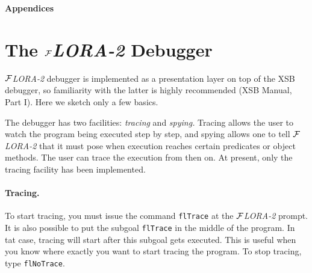 \documentclass[11pt]{article}
\newcommand{\FLORA}{{\mbox{${\cal F}${\small\it LORA}\rm\emph{-2}}}\xspace}
\begin{document}
\appendix

\newpage

\noindent
{\LARGE\bf Appendices}


\section{The \FLORA Debugger}


\FLORA debugger is implemented as a presentation layer on top of the XSB
debugger, so familiarity with the latter is highly recommended (XSB Manual,
Part I). Here we sketch only a few basics.

The debugger has two facilities: \emph{tracing} and \emph{spying.} Tracing
allows the user to watch the program being executed step by step, and
spying allows one to tell \FLORA that it must pose when execution reaches
certain predicates or object methods. The user can trace the execution from
then on. At present, only the tracing facility has been implemented.

\paragraph{Tracing.}
To start tracing, you must issue the command {\tt flTrace} at the
\FLORA prompt. It is also possible to put the subgoal {\tt flTrace} in
the middle of the program. In tat case, tracing will start after this
subgoal gets executed. This is useful when you know where exactly you want
to start tracing the program. To stop tracing, type {\tt flNoTrace}.
\end{document}
